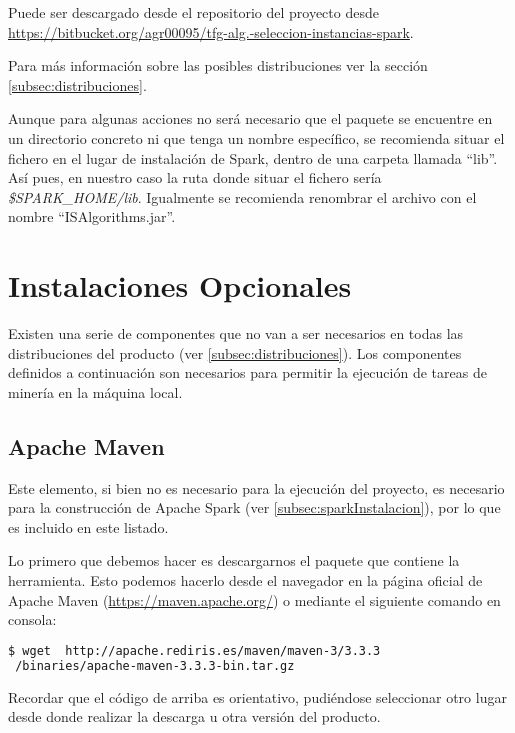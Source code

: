 Puede ser descargado desde el repositorio del proyecto desde \url{https://bitbucket.org/agr00095/tfg-alg.-seleccion-instancias-spark}.

Para más información sobre las posibles distribuciones ver la sección \ref{subsec:distribuciones}.

Aunque para algunas acciones no será necesario que el paquete se encuentre en un directorio concreto ni que tenga un nombre específico, se recomienda situar el fichero en el lugar de instalación de Spark, dentro de una carpeta llamada ``lib''. Así pues, en nuestro caso la ruta donde situar el fichero sería \textit{\$SPARK\_HOME/lib}. Igualmente se recomienda renombrar el archivo con el nombre ``ISAlgorithms.jar''.



\section{Instalaciones Opcionales}\label{sec:InstalacionOpcional}

Existen una serie de componentes que no van a ser necesarios en todas las distribuciones del producto (ver \ref{subsec:distribuciones}). Los componentes definidos a continuación son necesarios para permitir la ejecución de tareas de minería en la máquina local.

\subsection{Apache Maven}\label{subsec:instalaMaven}

Este elemento, si bien no es necesario para la ejecución del proyecto, es necesario para la construcción de Apache Spark (ver \ref{subsec:sparkInstalacion}), por lo que es incluido en este listado.

Lo primero que debemos hacer es descargarnos el paquete que contiene la herramienta. Esto podemos hacerlo desde el navegador en la página oficial de Apache Maven (\url{https://maven.apache.org/}) o mediante el siguiente comando en consola:

\begin{lstlisting}[language=bash]
$ wget  http://apache.rediris.es/maven/maven-3/3.3.3
 /binaries/apache-maven-3.3.3-bin.tar.gz
\end{lstlisting}

Recordar que el código de arriba es orientativo, pudiéndose seleccionar otro lugar desde donde realizar la descarga u otra versión del producto.

